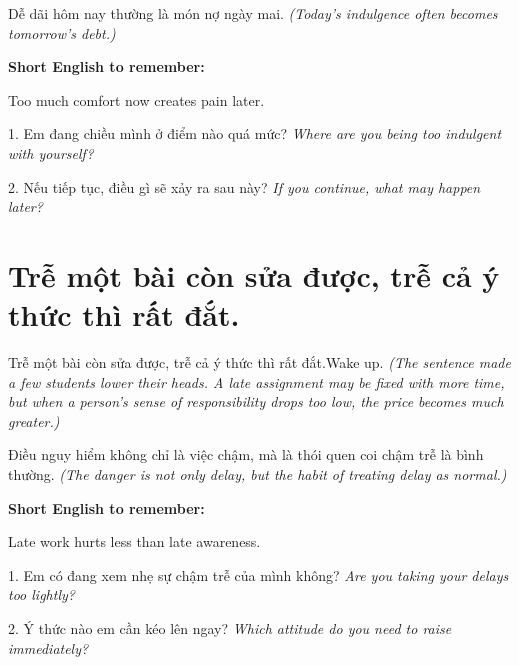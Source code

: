 \begin{baihoc}
Dễ dãi hôm nay thường là món nợ ngày mai.
\textit{(Today's indulgence often becomes tomorrow's debt.)}
\end{baihoc}

\begin{ghinhoanh}
\textbf{Short English to remember:}

Too much comfort now creates pain later.

\end{ghinhoanh}

\begin{tuhocnhanh}
1. Em đang chiều mình ở điểm nào quá mức? \textit{Where are you being too indulgent with yourself?}

2. Nếu tiếp tục, điều gì sẽ xảy ra sau này? \textit{If you continue, what may happen later?}
\end{tuhocnhanh}
\ngancach

\section{Trễ một bài còn sửa được, trễ cả ý thức thì rất đắt.}
\begin{truyen}{Trễ một bài còn sửa được, trễ cả ý thức thì rất đắt.}{Wake up.}
\textit{(The sentence made a few students lower their heads. A late assignment may be fixed with more time, but when a person's sense of responsibility drops too low, the price becomes much greater.)}
\end{truyen}

\begin{baihoc}
Điều nguy hiểm không chỉ là việc chậm, mà là thói quen coi chậm trễ là bình thường.
\textit{(The danger is not only delay, but the habit of treating delay as normal.)}
\end{baihoc}

\begin{ghinhoanh}
\textbf{Short English to remember:}

Late work hurts less than late awareness.

\end{ghinhoanh}

\begin{tuhocnhanh}
1. Em có đang xem nhẹ sự chậm trễ của mình không? \textit{Are you taking your delays too lightly?}

2. Ý thức nào em cần kéo lên ngay? \textit{Which attitude do you need to raise immediately?}
\end{tuhocnhanh}
\ngancach

